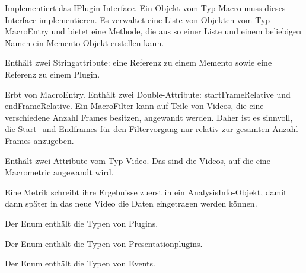 Implementiert das IPlugin Interface. Ein Objekt vom Typ Macro muss dieses Interface implementieren. Es verwaltet eine Liste von Objekten vom Typ MacroEntry und bietet eine Methode, die aus so einer Liste und einem beliebigen Namen ein Memento-Objekt erstellen kann.


Enthält zwei Stringattribute: eine Referenz zu einem Memento sowie eine Referenz zu einem Plugin.


Erbt von MacroEntry. Enthält zwei Double-Attribute: startFrameRelative und endFrameRelative. Ein MacroFilter kann auf Teile von Videos, die eine verschiedene Anzahl Frames besitzen, angewandt werden. Daher ist es sinnvoll, die Start- und Endframes für den Filtervorgang nur relativ zur gesamten Anzahl Frames anzugeben.


Enthält zwei Attribute vom Typ Video. Das sind die Videos, auf die eine Macrometric angewandt wird.

Eine Metrik schreibt ihre Ergebnisse zuerst in ein AnalysisInfo-Objekt, damit dann später in das neue Video die Daten eingetragen werden können.


Der Enum enthält die Typen von Plugins.


Der Enum enthält die Typen von Presentationplugins.


Der Enum enthält die Typen von Events.
